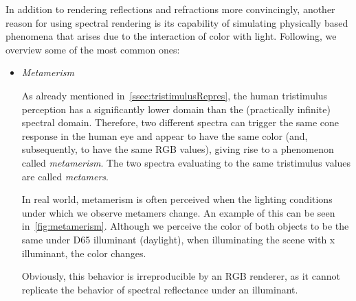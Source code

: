 In addition to rendering reflections and refractions more convincingly, another reason for using spectral rendering is its capability of simulating physically based phenomena that arises due to the interaction of color with light. Following, we overview some of the most common ones:
\begin{itemize}
\item \emph{Metamerism} \label{item:metamerism}

As already mentioned in~\cref{ssec:tristimulusRepres}, the human tristimulus perception has a significantly lower domain than the (practically infinite) spectral domain. Therefore, two different spectra can trigger the same cone response in the human eye and appear to have the same color (and, subsequently, to have the same RGB values), giving rise to a phenomenon called \emph{metamerism}. The two spectra evaluating to the same tristimulus values are called \emph{metamers}.

In real world, metamerism is often perceived when the lighting conditions under which we observe metamers change. An example of this can be seen in~\cref{fig:metamerism}. Although we perceive the color of both objects to be the same under D65 illuminant (daylight), when illuminating the scene with x illuminant, the color changes.

Obviously, this behavior is irreproducible by an RGB renderer, as it cannot replicate the behavior of spectral reflectance under an illuminant.


\end{itemize}
